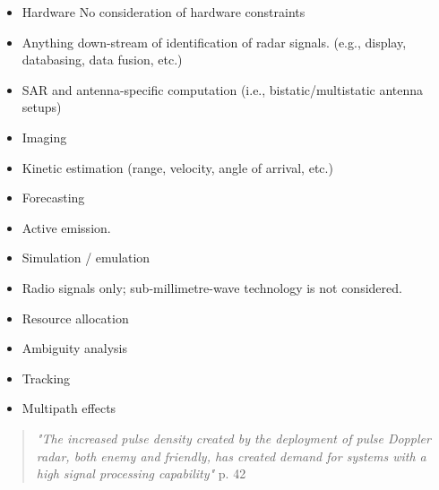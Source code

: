 \begin{itemize}
    \item Hardware
        No consideration of hardware constraints 
    \item Anything down-stream of identification of radar signals. (e.g., display, databasing, data fusion, etc.)
    \item \ac{SAR} and antenna-specific computation (i.e., bistatic/multistatic antenna setups)
    \item Imaging
    \item Kinetic estimation (range, velocity, angle of arrival, etc.)
    \item Forecasting
    \item Active emission.
    \item Simulation / emulation
    \item Radio signals only; sub-millimetre-wave technology is not considered.
    \item Resource allocation
    \item Ambiguity analysis
    \item Tracking
    \item Multipath effects
\end{itemize}



\begin{quote}
    \textit{"The increased pulse density created by the deployment of pulse Doppler radar, both enemy and friendly, has created demand for systems with a high signal processing capability"} \cite{pettersson_illustrated_1992} p. 42
\end{quote}


